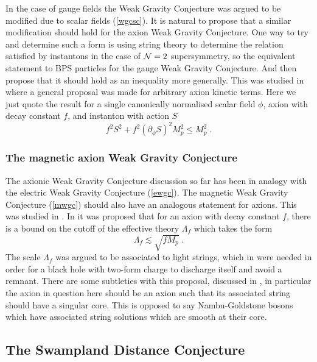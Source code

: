 \documentclass[11pt,a4paper]{article}
\numberwithin{equation}{section}
\numberwithin{table}{section}\setlength{\multlinegap}{25pt}
\newcommand{\be}{\begin{equation}}
\newcommand{\ee}{\end{equation}}
\begin{document}
In the case of gauge fields the Weak Gravity Conjecture was argued to be modified due to scalar fields (\ref{wgcsc}). It is natural to propose that a similar modification should hold for the axion Weak Gravity Conjecture. One way to try and determine such a form is using string theory to determine the relation satisfied by instantons in the case of ${\cal N}=2$ supersymmetry, so the equivalent statement to BPS particles for the gauge Weak Gravity Conjecture. And then propose that it should hold as an inequality more generally. This was studied in \cite{Vittmann} where a general proposal was made for arbitrary axion kinetic terms. Here we just quote the result for a single canonically normalised scalar field $\phi$, axion with decay constant $f$, and instanton with action $S$
\be
f^2 S^2 + f^2 \left( \partial_{\phi} S \right)^2 M_p^2 \leq M_p^2 \;.
\ee   

\subsubsection*{The magnetic axion Weak Gravity Conjecture}

The axionic Weak Gravity Conjecture discussion so far has been in analogy with the electric Weak Gravity Conjecture (\ref{ewgc}). The magnetic Weak Gravity Conjecture (\ref{mwgc}) should also have an analogous statement for axions. This was studied in \cite{Hebecker:2017wsu,Hebecker:2017uix,Reece:2018zvv}. In \cite{Hebecker:2017uix} it was proposed that for an axion with decay constant $f$, there is a bound on the cutoff of the effective theory $\Lambda_f$ which takes the form
\be 
\Lambda_f \lesssim \sqrt{f M_p} \;.
\label{magf}
\ee
The scale $\Lambda_f$ was argued to be associated to light strings, which in \cite{Hebecker:2017uix} were needed in order for a black hole with two-form charge to discharge itself and avoid a remnant. 
There are some subtleties with this proposal, discussed in \cite{Hebecker:2017uix,Reece:2018zvv}, in particular the axion in question here should be an axion such that its associated string should have a singular core. This is opposed to say Nambu-Goldstone bosons which have associated string solutions which are smooth at their core.


\subsection{The Swampland Distance Conjecture}
\label{sec:sdc}
\end{document}
